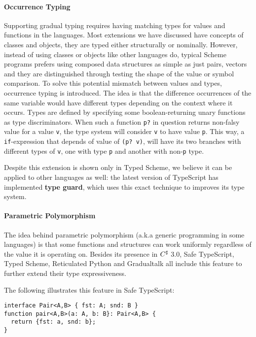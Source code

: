 \paragraph{Occurrence Typing}

Supporting gradual typing requires having matching types for values and functions in the languages.
Most extensions we have discussed have concepts of classes and objects, they are typed either
structurally or nominally.
However, instead of using classes or objects like other languages do,
typical Scheme programs prefers using composed data structures as simple as just pairs, vectors
and they are distinguished through testing the shape of the value or symbol comparison.
To solve this potential mismatch between values and types, occurrence typing is introduced.
The idea is that the difference occurrences of the same variable would have different types
depending on the context where it occurs.
Types are defined by specifying some boolean-returning unary functions as type discriminators.
When such a function \texttt{p?} in question returns non-falsy value for a value \texttt{v},
the type system will consider \texttt{v} to have value \texttt{p}.
This way, a \texttt{if}-expression that depends of value of \texttt{(p? v)},
will have its two branches with different types of \texttt{v}, one with type \texttt{p}
and another with non-\texttt{p} type.

Despite this extension is shown only in Typed Scheme, we believe it can be applied to other languages
as well: the latest version of TypeScript has implemented \textbf{type guard},
which uses this exact technique to improves its type system.

\paragraph{Parametric Polymorphism}

The idea behind parametric polymorphism (a.k.a generic programming in some languages)
is that some functions and structures can
work uniformly regardless of the value it is operating on.
Besides its presence in $C^\sharp$ 3.0,
Safe TypeScript, Typed Scheme, Reticulated Python and Gradualtalk all include
this feature to further extend their type expressiveness.

The following illustrates this feature in Safe TypeScript:

\begin{verbatim}
interface Pair<A,B> { fst: A; snd: B }
function pair<A,B>(a: A, b: B}: Pair<A,B> {
  return {fst: a, snd: b};
}
\end{verbatim}


